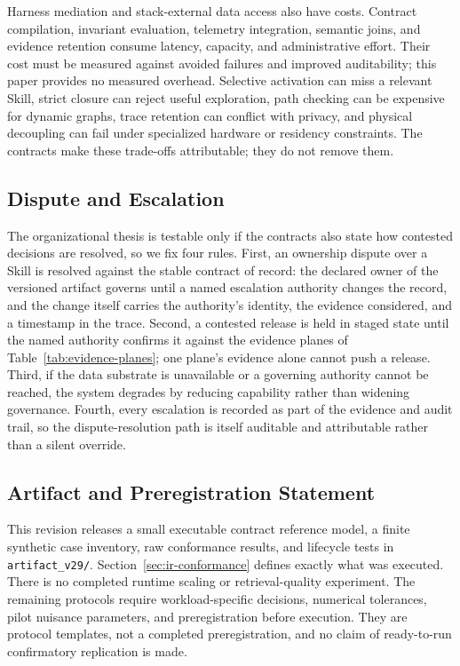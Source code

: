 Harness mediation and stack-external data access also have costs. Contract compilation, invariant evaluation, telemetry integration, semantic joins, and evidence retention consume latency, capacity, and administrative effort. Their cost must be measured against avoided failures and improved auditability; this paper provides no measured overhead. Selective activation can miss a relevant Skill, strict closure can reject useful exploration, path checking can be expensive for dynamic graphs, trace retention can conflict with privacy, and physical decoupling can fail under specialized hardware or residency constraints. The contracts make these trade-offs attributable; they do not remove them.

\subsection{Dispute and Escalation}

The organizational thesis is testable only if the contracts also state how contested decisions are resolved, so we fix four rules. First, an ownership dispute over a Skill is resolved against the stable contract of record: the declared owner of the versioned artifact governs until a named escalation authority changes the record, and the change itself carries the authority's identity, the evidence considered, and a timestamp in the trace. Second, a contested release is held in staged state until the named authority confirms it against the evidence planes of Table~\ref{tab:evidence-planes}; one plane's evidence alone cannot push a release. Third, if the data substrate is unavailable or a governing authority cannot be reached, the system degrades by reducing capability rather than widening governance. Fourth, every escalation is recorded as part of the evidence and audit trail, so the dispute-resolution path is itself auditable and attributable rather than a silent override.

\subsection{Artifact and Preregistration Statement}

This revision releases a small executable contract reference model, a finite synthetic case inventory, raw conformance results, and lifecycle tests in \texttt{artifact\_v29/}. Section~\ref{sec:ir-conformance} defines exactly what was executed. There is no completed runtime scaling or retrieval-quality experiment. The remaining protocols require workload-specific decisions, numerical tolerances, pilot nuisance parameters, and preregistration before execution. They are protocol templates, not a completed preregistration, and no claim of ready-to-run confirmatory replication is made.

